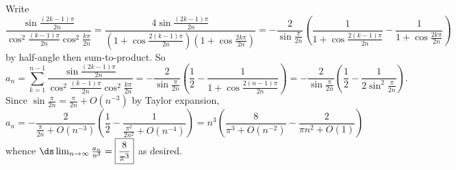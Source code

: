 Write
\[
	\frac{\sin\frac{(2k-1)\pi}{2n}}{\cos^2\frac{(k-1)\pi}{2n}\cos^2\frac{k\pi}{2n}}=\frac{4\sin\frac{(2k-1)\pi}{2n}}{\left(1+\cos\frac{2(k-1)\pi}{2n}\right)\left(1+\cos\frac{2k\pi}{2n}\right)}=-\frac{2}{\sin\frac{\pi}{2n}}\left(\frac{1}{1+\cos\frac{2(k-1)\pi}{2n}}-\frac{1}{1+\cos\frac{2k\pi}{2n}}\right)
\]
by half-angle then sum-to-product. So
\[
	a_n=\sum_{k=1}^{n-1}\frac{\sin\frac{(2k-1)\pi}{2n}}{\cos^2\frac{(k-1)\pi}{2n}\cos^2\frac{k\pi}{2n}}=-\frac{2}{\sin\frac{\pi}{2n}}\left(\frac{1}{2}-\frac{1}{1+\cos\frac{2(n-1)\pi}{2n}}\right)=-\frac{2}{\sin\frac{\pi}{2n}}\left(\frac{1}{2}-\frac{1}{2\sin^2\frac{\pi}{2n}}\right).
\]
Since $\sin\frac{\pi}{2n}=\frac{\pi}{2n}+O(n^{-3})$ by Taylor expansion, 
\[
	a_n=-\frac{2}{\frac{\pi}{2n}+O(n^{-3})}\left(\frac{1}{2}-\frac{1}{\frac{\pi^2}{2n^2}+O(n^{-4})}\right)=n^3\left(\frac{8}{\pi^3+O(n^{-2})}-\frac{2}{\pi n^2+O(1)}\right)
\]
whence $\ds\lim_{n\to\infty}\frac{a_n}{n^3}=\boxed{\frac{8}{\pi^3}}$ as desired.